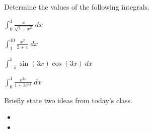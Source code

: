 \begin{problem}
\begin{subproblem}
        \vfill
    \end{subproblem}

    \clearpage

\item Determine the values of the following integrals.
\begin{subproblem}

  \item ${\displaystyle \int^1_0 \frac{x}{\sqrt{1-x^2}} ~ dx }$
      \vfill

  \item ${\displaystyle \int^{10}_1 \frac{x^2}{2+x} ~ dx }$
    \vfill

    \clearpage

  \item ${\displaystyle \int^5_{-5} \sin(3x)\cos(3x) ~ dx }$
    \vfill

  \item ${\displaystyle \int^1_0 \frac{e^{2x}}{1+3e^{4x}} ~ dx }$
  \vfill

  \end{subproblem}

\end{problem}


\postClass

\begin{problem}
\item Briefly state two ideas from today's class.
  \begin{itemize}
  \item
  \item
  \end{itemize}
  \item ~
    \begin{subproblem}
    \item ~
      \vfill
    \item ~
      \vfill
    \item ~
      \vfill
    \end{subproblem}
\end{problem}



